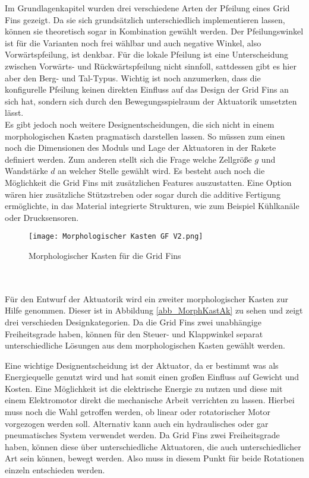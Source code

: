 Im Grundlagenkapitel wurden drei verschiedene Arten der Pfeilung eines Grid Fins gezeigt. Da sie sich grundsätzlich unterschiedlich implementieren lassen, können sie theoretisch sogar in Kombination gewählt werden. Der Pfeilungswinkel ist für die Varianten noch frei wählbar und auch negative Winkel, also Vorwärtspfeilung, ist denkbar. Für die lokale Pfeilung ist eine Unterscheidung zwischen Vorwärts- und Rückwärtspfeilung nicht sinnfoll, sattdessen gibt es hier aber den Berg- und Tal-Typus. Wichtig ist noch anzumerken, dass die konfigurelle Pfeilung keinen direkten Einfluss auf das Design der Grid Fins an sich hat, sondern sich durch den Bewegungsspielraum der Aktuatorik umsetzten lässt.\\
Es gibt jedoch noch weitere Designentscheidungen, die sich nicht in einem morphologischen Kasten pragmatisch darstellen lassen. So müssen zum einen noch die Dimensionen des Moduls und Lage der Aktuatoren in der Rakete definiert werden. Zum anderen stellt sich die Frage welche Zellgröße $g$ und Wandstärke $d$ an welcher Stelle gewählt wird. Es besteht auch noch die Möglichkeit die Grid Fins mit zusätzlichen Features auszustatten. Eine Option wären hier zusätzliche Stützstreben oder sogar durch die additive Fertigung ermöglichte, in das Material integrierte Strukturen, wie zum Beispiel Kühlkanäle oder Drucksensoren.
\begin{figure}[h]
	\centering
	\texttt{[image: Morphologischer Kasten GF V2.png]}
	\caption{Morphologischer Kasten für die Grid Fins}
	\label{abb_MorphKastGF}
\end{figure}\\~\\
Für den Entwurf der Aktuatorik wird ein zweiter morphologischer Kasten zur Hilfe genommen. Dieser ist in Abbildung \ref{abb_MorphKastAk} zu sehen und zeigt drei verschieden Designkategorien. Da die Grid Fins zwei unabhängige Freiheitsgrade haben, können für den Steuer- und Klappwinkel separat unterschiedliche Lösungen aus dem morphologischen Kasten gewählt werden.

Eine wichtige Designentscheidung ist der Aktuator, da er bestimmt was als Energiequelle genutzt wird und hat somit einen großen Einfluss auf Gewicht und Kosten. Eine Möglichkeit ist die elektrische Energie zu nutzen und diese mit einem Elektromotor direkt die mechanische Arbeit verrichten zu lassen. Hierbei muss noch die Wahl getroffen werden, ob linear oder rotatorischer Motor vorgezogen werden soll. Alternativ kann auch ein hydraulisches oder gar pneumatisches System verwendet werden. Da Grid Fins zwei Freiheitsgrade haben, können diese über unterschiedliche Aktuatoren, die auch unterschiedlicher Art sein können, bewegt werden. Also muss in diesem Punkt für beide Rotationen einzeln entschieden werden.


